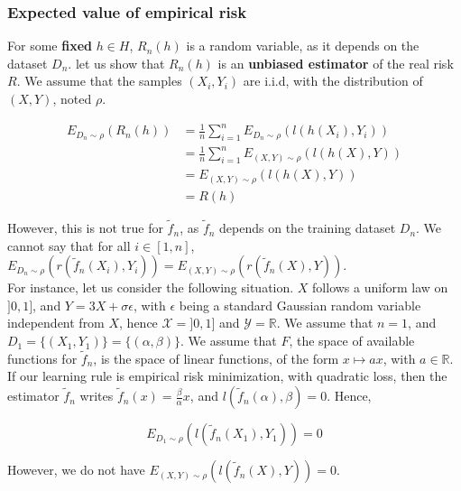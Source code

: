 \documentclass[
10pt, %
a4paper, %
oneside, %
headinclude,footinclude, %
BCOR5mm, %
]{scrartcl}
\begin{document}
\subsubsection{\large\color{Periwinkle}Expected value of empirical risk}

For some \textbf{{fixed}} $h\in H$, $R_n(h)$ is a random variable, as it depends on the dataset $D_n$. let us show that $ R_n(h)$ is an \textbf{{unbiased estimator}} of the real risk $R$. We assume that the samples $(X_i, Y_i)$ are i.i.d, with the distribution of $(X,Y)$, noted $\rho$. 

    \begin{equation*}
	    \begin{aligned}
		E_{D_n\sim \rho}(R_n(h)) &= \frac{1}{n} \sum^{n}_{i=1} E_{D_n\sim \rho}(l(h(X_i), Y_i)) \\
		&= \frac{1}{n} \sum^{n}_{i=1} E_{(X,Y)\sim \rho}(l(h(X), Y)) \\
		&=  E_{(X,Y)\sim \rho}(l(h(X), Y)) \\
		&= R(h)
	    \end{aligned}
    \end{equation*}

    However, this is not true for $ \tilde{f}_n$, as $ \tilde{f}_n$ depends on the training dataset $ D_n$. We cannot say that for all $i\in [1, n]$, $E_{D_n\sim \rho}(r( \tilde{f}_n(X_i), Y_i)) = E_{(X,Y)\sim\rho}(r( \tilde{f}_n(X), Y))$.
    \\

    For instance, let us consider the following situation. $X$ follows a uniform law on $]0, 1]$, and $Y=3X+\sigma\epsilon$, with $\epsilon$ being a standard Gaussian random variable independent from $X$, hence $ \mathcal{X} = ]0, 1]$ and $ \mathcal{Y} = \mathbb{R} $. We assume that $n=1$, and $D_1 = \{(X_1, Y_1)\}=\{(\alpha, \beta)\}$. We assume that $F$, the space of available functions for $ \tilde{f}_n$, is the space of linear functions, of the form $ x\mapsto ax$, with $a\in \mathbb{R}$. If our learning rule is empirical risk minimization, with quadratic loss, then the estimator $ \tilde{f}_n$ writes $ \tilde{f}_n(x)= \frac{\beta}{\alpha}x$, and $l( \tilde{f}_n(\alpha), \beta)=0$. Hence,

    \begin{equation}
	E_{D_1\sim \rho}(l( \tilde{f}_n(X_1), Y_1))=0
    \end{equation}

    However, we do not have $E_{(X,Y)\sim \rho}(l( \tilde{f}_n(X), Y))=0$.
\end{document}
